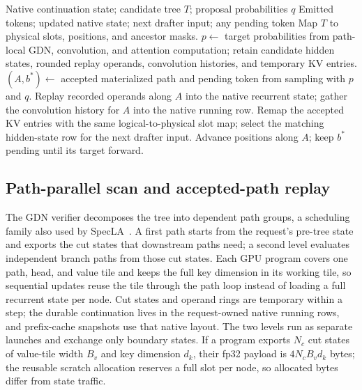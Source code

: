 \documentclass[sigconf,anonymous,review]{acmart}
\begin{document}
\begin{algorithm}[t]
\caption{Tree verification and native continuation}
\label{alg:verify}
\small
\begin{algorithmic}[1]
\Require Native continuation state; candidate tree $T$; proposal probabilities $q$
\Ensure Emitted tokens; updated native state; next drafter input; any pending token
\State Map $T$ to physical slots, positions, and ancestor masks.
\State $p\gets$ target probabilities from path-local GDN, convolution, and attention computation; retain candidate hidden states, rounded replay operands, convolution histories, and temporary KV entries.
\State $(A,b^*)\gets$ accepted materialized path and pending token from sampling with $p$ and $q$.
  \State Replay recorded operands along $A$ into the native recurrent state; gather the convolution history for $A$ into the native running row.
\EndFor
\State Remap the accepted KV entries with the same logical-to-physical slot map; select the matching hidden-state row for the next drafter input.
\State Advance positions along $A$; keep $b^*$ pending until its target forward.
\end{algorithmic}
\end{algorithm}

\subsection{Path-parallel scan and accepted-path replay}
\label{sec:kernel}
The GDN verifier decomposes the tree into dependent path groups, a scheduling family also used by SpecLA~\cite{wang2026specla}. A first path starts from the request's pre-tree state and exports the cut states that downstream paths need; a second level evaluates independent branch paths from those cut states. Each GPU program covers one path, head, and value tile and keeps the full key dimension in its working tile, so sequential updates reuse the tile through the path loop instead of loading a full recurrent state per node. Cut states and operand rings are temporary within a step; the durable continuation lives in the request-owned native running rows, and prefix-cache snapshots use that native layout. The two levels run as separate launches and exchange only boundary states. If a program exports $N_c$ cut states of value-tile width $B_v$ and key dimension $d_k$, their fp32 payload is $4N_cB_vd_k$ bytes; the reusable scratch allocation reserves a full slot per node, so allocated bytes differ from state traffic.
\end{document}
